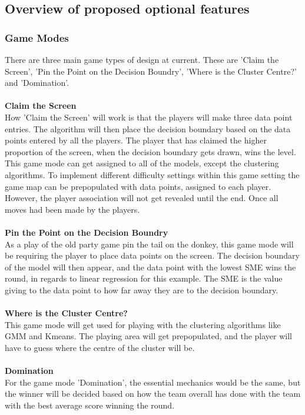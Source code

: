 \documentclass[a4paper,10pt]{article}
\begin{document}
\subsection{Overview of proposed optional features}

\subsubsection{Game Modes}
There are three main game types of design at current. These are 'Claim the Screen', 'Pin the Point on the Decision Boundry', 'Where is the Cluster Centre?' and 'Domination'.\\
 \\
\textbf{Claim the Screen}
\\How 'Claim the Screen' will work is that the players will make three data point entries. The algorithm will then place the decision boundary based on the data points entered by all the players. The player that has claimed the higher proportion of the screen, when the decision boundary gets drawn, wins the level. This game mode can get assigned to all of the models, except the clustering algorithms. To implement different difficulty settings within this game setting the game map can be prepopulated with data points, assigned to each player. However, the player association will not get revealed until the end. Once all moves had been made by the players. \\
 \\
\textbf{Pin the Point on the Decision Boundry}
\\As a play of the old party game pin the tail on the donkey, this game mode will be requiring the player to place data points on the screen. The decision boundary of the model will then appear, and the data point with the lowest SME wins the round, in regards to linear regression for this example. The SME is the value giving to the data point to how far away they are to the decision boundary. \\
 \\
\textbf{Where is the Cluster Centre?}
\\This game mode will get used for playing with the clustering algorithms like GMM and Kmeans. The playing area will get prepopulated, and the player will have to guess where the centre of the cluster will be. \\
 \\
\textbf{Domination}
\\For the game mode 'Domination', the essential mechanics would be the same, but the winner will be decided based on how the team overall has done with the team with the best average score winning the round.
\end{document}
